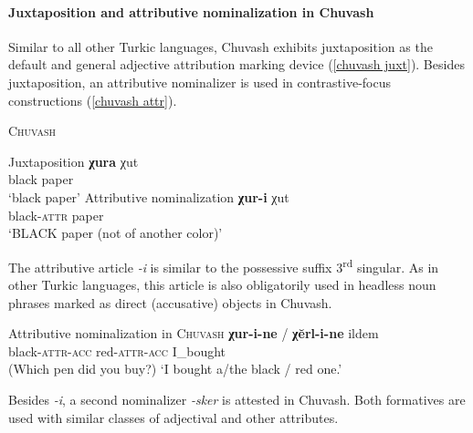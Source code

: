 \paragraph{Juxtaposition and attributive nominalization in Chuvash}\label{chuvash synchr}
Similar to all other Turkic languages, Chuvash exhibits juxtaposition as the default and general adjective attribution marking device (\ref{chuvash juxt}). Besides juxtaposition, an attributive nominalizer is used in contrastive-focus constructions (\ref{chuvash attr}).
\begin{exe}
\ex	\textsc{Chuvash} \citep{clark1998a}
\begin{xlist}
\ex 	Juxtaposition \label{chuvash juxt}
\gll	\textbf{χura} χut\\
	black paper\\
\glt	‘black paper’
\ex	Attributive nominalization \label{chuvash attr}
\gll	\textbf{χur-i} χut\\					 		
	black-\textsc{attr} paper\\
\glt	‘BLACK paper (not of another color)’
\end{xlist}
\end{exe}
The attributive article \textit{-i} is similar to the possessive suffix 3\textsuperscript{rd} singular. As in other Turkic languages, this article is also obligatorily used in headless noun phrases marked as direct (accusative) objects in Chuvash.
\begin{exe}
\ex Attributive nominalization in \textsc{Chuvash} \citep[7]{benzing1993b} \label{chuvash headless acc}	
\gll	\textbf{χur-i-ne} / \textbf{χĕrl-i-ne} ildem\\
 	black-\textsc{attr}-\textsc{acc} { } red-\textsc{attr}-\textsc{acc} I\_bought\\
\glt 	(Which pen did you buy?) ‘I bought a/the black / red one.’
\end{exe}
Besides \textit{-i}, a second nominalizer \textit{-sker} is attested in Chuvash. Both formatives are used with similar classes of adjectival and other attributes.
